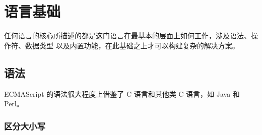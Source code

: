 \chapter{语言基础}
任何语言的核心所描述的都是这门语言在最基本的层面上如何工作，涉及语法、操作符、数据类型
以及内置功能，在此基础之上才可以构建复杂的解决方案。
\section{语法}
ECMAScript 的语法很大程度上借鉴了 C 语言和其他类 C 语言，如 Java 和 Perl。
\subsection{区分大小写}

